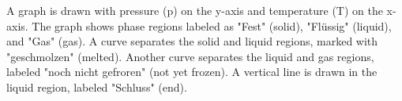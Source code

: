 A graph is drawn with pressure (p) on the y-axis and temperature (T) on the x-axis. The graph shows phase regions labeled as "Fest" (solid), "Flüssig" (liquid), and "Gas" (gas). A curve separates the solid and liquid regions, marked with "geschmolzen" (melted). Another curve separates the liquid and gas regions, labeled "noch nicht gefroren" (not yet frozen). A vertical line is drawn in the liquid region, labeled "Schluss" (end).